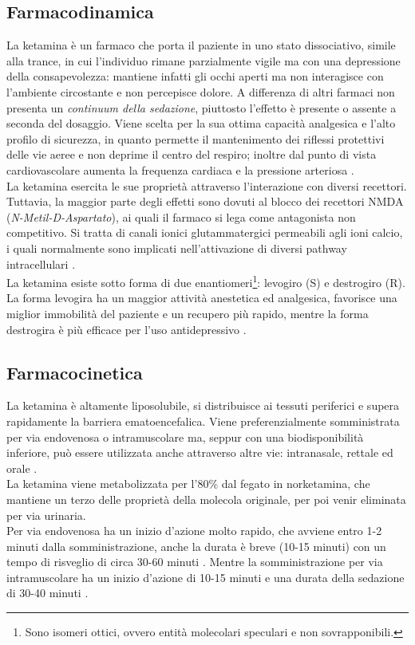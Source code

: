 \subsection*{Farmacodinamica}

La ketamina è un farmaco che porta il paziente in uno stato dissociativo, simile alla trance, in cui l'individuo rimane parzialmente vigile ma con una depressione della consapevolezza: mantiene infatti gli occhi aperti ma non interagisce con l'ambiente circostante e non percepisce dolore. A differenza di altri farmaci non presenta un \emph{continuum della sedazione}, piuttosto l'effetto è presente o assente a seconda del dosaggio. Viene scelta per la sua ottima capacità analgesica e l'alto profilo di sicurezza, in quanto permette il mantenimento dei riflessi protettivi delle vie aeree e non deprime il centro del respiro; inoltre dal punto di vista cardiovascolare aumenta la frequenza cardiaca e la pressione arteriosa \cite{Krauss2006}. 
\\La ketamina esercita le sue proprietà attraverso l'interazione con diversi recettori. Tuttavia, la maggior parte degli effetti sono dovuti al blocco dei recettori NMDA (\emph{N-Metil-D-Aspartato}), ai quali il farmaco si lega come antagonista non competitivo. Si tratta di canali ionici glutammatergici permeabili agli ioni calcio, i quali normalmente sono implicati nell'attivazione di diversi pathway intracellulari \cite{Zanos2018}.
\\La ketamina esiste sotto forma di due enantiomeri\footnote{Sono isomeri ottici, ovvero entità molecolari speculari e non sovrapponibili.}: levogiro (S) e destrogiro (R). La forma levogira ha un maggior attività anestetica ed analgesica, favorisce una miglior immobilità del paziente e un recupero più rapido, mentre la forma destrogira è più efficace per l'uso antidepressivo \cite{Simeupsedazione}.

\subsection*{Farmacocinetica}

La ketamina è altamente liposolubile, si distribuisce ai tessuti periferici e supera rapidamente la barriera ematoencefalica. Viene preferenzialmente somministrata per via endovenosa o intramuscolare ma, seppur con una biodisponibilità inferiore, può essere utilizzata anche attraverso altre vie: intranasale, rettale ed orale \cite{Simeupsedazione, Ketamineapplication2019}. 
\\La ketamina viene metabolizzata per l'80\% dal fegato in norketamina, che mantiene un terzo delle proprietà della molecola originale, per poi venir eliminata per via urinaria. 
\\Per via endovenosa ha un inizio d'azione molto rapido, che avviene entro 1-2 minuti dalla somministrazione, anche la durata è breve (10-15 minuti) con un tempo di risveglio di circa 30-60 minuti \cite{Uptodatepharmacology}. Mentre la somministrazione per via intramuscolare ha un inizio d'azione di 10-15 minuti e una durata della sedazione di 30-40 minuti \cite{Berkenbosch2015}.

